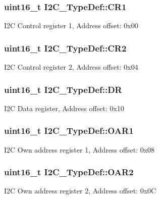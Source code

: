 \subsubsection[{\texorpdfstring{C\+R1}{CR1}}]{ uint16\+\_\+t I2\+C\+\_\+\+Type\+Def\+::\+C\+R1}\hypertarget{struct_i2_c___type_def_ad35ea0b199cefb757de20e9b78168534}{}\label{struct_i2_c___type_def_ad35ea0b199cefb757de20e9b78168534}
I2C Control register 1, Address offset\+: 0x00 
\subsubsection[{\texorpdfstring{C\+R2}{CR2}}]{ uint16\+\_\+t I2\+C\+\_\+\+Type\+Def\+::\+C\+R2}\hypertarget{struct_i2_c___type_def_ac8bff45acc455489620d50e697a24c9d}{}\label{struct_i2_c___type_def_ac8bff45acc455489620d50e697a24c9d}
I2C Control register 2, Address offset\+: 0x04 
\subsubsection[{\texorpdfstring{DR}{DR}}]{ uint16\+\_\+t I2\+C\+\_\+\+Type\+Def\+::\+DR}\hypertarget{struct_i2_c___type_def_a5c1551b886fbb8e801b9203f6d7dc7c5}{}\label{struct_i2_c___type_def_a5c1551b886fbb8e801b9203f6d7dc7c5}
I2C Data register, Address offset\+: 0x10 
\subsubsection[{\texorpdfstring{O\+A\+R1}{OAR1}}]{ uint16\+\_\+t I2\+C\+\_\+\+Type\+Def\+::\+O\+A\+R1}\hypertarget{struct_i2_c___type_def_ad218fdcb9606477c1d63f8ee38d3c5c9}{}\label{struct_i2_c___type_def_ad218fdcb9606477c1d63f8ee38d3c5c9}
I2C Own address register 1, Address offset\+: 0x08 
\subsubsection[{\texorpdfstring{O\+A\+R2}{OAR2}}]{ uint16\+\_\+t I2\+C\+\_\+\+Type\+Def\+::\+O\+A\+R2}\hypertarget{struct_i2_c___type_def_a03189e2a57c81ae5d103739b72f52c93}{}\label{struct_i2_c___type_def_a03189e2a57c81ae5d103739b72f52c93}
I2C Own address register 2, Address offset\+: 0x0C 
